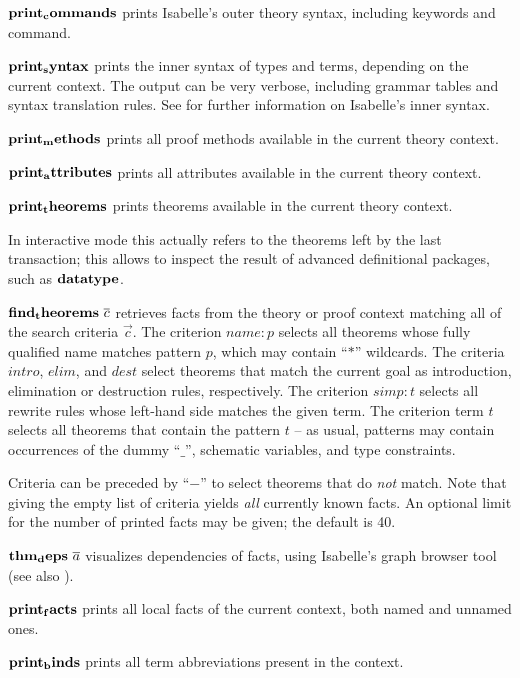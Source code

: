 \begin{descr}
  
\item [${\mathord{\mathbf{print_commands}}}$] prints Isabelle's outer theory syntax,
  including keywords and command.
  
\item [${\mathord{\mathbf{print_syntax}}}$] prints the inner syntax of types and
  terms, depending on the current context.  The output can be very verbose,
  including grammar tables and syntax translation rules.  See \cite[\S7,
  \S8]{isabelle-ref} for further information on Isabelle's inner syntax.
  
\item [${\mathord{\mathbf{print_methods}}}$] prints all proof methods available in
  the current theory context.
  
\item [${\mathord{\mathbf{print_attributes}}}$] prints all attributes available in
  the current theory context.
  
\item [${\mathord{\mathbf{print_theorems}}}$] prints theorems available in the
  current theory context.
  
  In interactive mode this actually refers to the theorems left by the last
  transaction; this allows to inspect the result of advanced definitional
  packages, such as ${\mathord{\mathbf{datatype}}}$.
  
\item [${\mathord{\mathbf{find_theorems}}}~\overline{c}$] retrieves facts from the theory
  or proof context matching all of the search criteria $\vec c$.  The
  criterion $name: p$ selects all theorems whose fully qualified name matches
  pattern $p$, which may contain ``$*$'' wildcards.  The criteria $intro$,
  $elim$, and $dest$ select theorems that match the current goal as
  introduction, elimination or destruction rules, respectively.  The criterion
  $simp: t$ selects all rewrite rules whose left-hand side matches the given
  term.  The criterion term $t$ selects all theorems that contain the pattern
  $t$ -- as usual, patterns may contain occurrences of the dummy ``$\_$'',
  schematic variables, and type constraints.
  
  Criteria can be preceded by ``$-$'' to select theorems that do \emph{not}
  match. Note that giving the empty list of criteria yields \emph{all}
  currently known facts.  An optional limit for the number of printed facts
  may be given; the default is 40.
  
\item [${\mathord{\mathbf{thm_deps}}}~\overline{a}$] visualizes dependencies of facts,
  using Isabelle's graph browser tool (see also \cite{isabelle-sys}).
  
\item [${\mathord{\mathbf{print_facts}}}$] prints all local facts of the
  current context, both named and unnamed ones.
  
\item [${\mathord{\mathbf{print_binds}}}$] prints all term abbreviations present in
  the context.

\end{descr}


